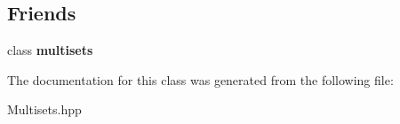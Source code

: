 \subsection*{Friends}
\begin{DoxyCompactItemize}
\item 
\hypertarget{classdscr_1_1multisets_1_1iterator_a1fad62d370233c8f18c7e81f343d056c}{class {\bfseries multisets}}\label{classdscr_1_1multisets_1_1iterator_a1fad62d370233c8f18c7e81f343d056c}

\end{DoxyCompactItemize}


The documentation for this class was generated from the following file\-:\begin{DoxyCompactItemize}
\item 
Multisets.\-hpp\end{DoxyCompactItemize}
